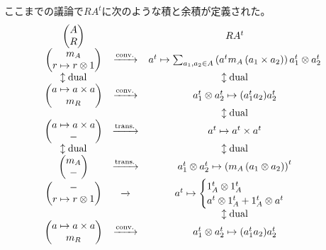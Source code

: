 	ここまでの議論で$RA^t$に次のような積と余積が定義された。
	\begin{equation}\begin{array}{ccc} %
		\begin{pmatrix} 
			A \\ R
		\end{pmatrix} & & RA^t \\
		\begin{pmatrix}
			m_A \\ r\mapsto r\otimes 1
		\end{pmatrix} &\xrightarrow{\text{conv.}}& a^t\mapsto \sum_{a_1,a_2\in A}\kakko{a^tm_A\kakko{a_1\times a_2}}a_1^t\otimes a_2^t \\
		\updownarrow \text{dual} & & \updownarrow \text{dual} \\
		\begin{pmatrix}
			a\mapsto a\times a \\ m_R
		\end{pmatrix} &\xrightarrow{\text{conv.}}& a_1^t\otimes a_2^t\mapsto (a_1^ta_2)a_2^t \\
		& & \updownarrow \text{dual} \\
		\begin{pmatrix}
			a\mapsto a\times a \\ -
		\end{pmatrix} &\xrightarrow{\text{trans.}}& a^t\mapsto a^t\times a^t \\
		\updownarrow \text{dual} & & \updownarrow \text{dual} \\
		\begin{pmatrix}
			m_A \\ -
		\end{pmatrix} &\xrightarrow{\text{trans.}}& a_1^t\otimes a_2^t\mapsto \kakko{m_A\kakko{a_1\otimes a_2}}^t \\
		\begin{pmatrix}
			- \\ r\mapsto r\otimes 1
		\end{pmatrix} &\xrightarrow{\text{}}& a^t\mapsto \begin{cases} 
			1_A^t\otimes 1_A^t \\
			a^t\otimes 1_A^t + 1_A^t\otimes a^t \\
		\end{cases} \\
		& & \updownarrow \text{dual} \\
		\begin{pmatrix}
			a\mapsto a\times a \\ m_R
		\end{pmatrix} &\xrightarrow{\text{conv.}}& a_1^t\otimes a_2^t\mapsto (a_1^ta_2)a_2^t \\
	\end{array}\end{equation} %
